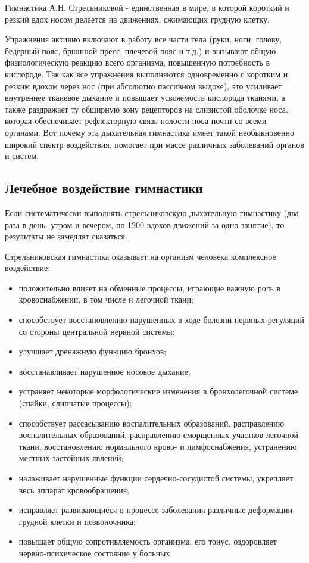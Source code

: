 \documentclass[14pt, a4paper]{article}
\begin{document}
    Гимнастика А.Н. Стрельниковой - единственная в мире, в которой короткий и резкий вдох носом делается на движениях, сжимающих грудную клетку.

    Упражнения активно включают в работу все части тела (руки, ноги, голову, бедерный пояс, брюшной пресс, плечевой пояс и т.д.) и вызывают общую физиологическую реакцию всего организма, повышенную потребность в кислороде. Так как все упражнения выполняются одновременно с коротким и резким вдохом через нос (при абсолютно пассивном выдохе), это усиливает внутреннее тканевое дыхание и повышает усвояемость кислорода тканями, а также раздражает ту обширную зону рецепторов на слизистой оболочке носа, которая обеспечивает рефлекторную связь полости носа почти со всеми органами. Вот почему эта дыхательная гимнастика имеет такой необыкновенно широкий спектр воздействия, помогает при массе различных заболеваний органов и систем.

    \subsection{Лечебное воздействие гимнастики}
    Если систематически выполнять стрельниковскую дыхательную гимнастику (два раза в день- утром и вечером, по 1200 вдохов-движений за одно занятие), то результаты не замедлят сказаться.

    Стрельниковская гимнастика оказывает на организм человека комплексное воздействие:
    \begin{itemize}
        \item положительно влияет на обменные процессы, играющие важную роль в кровоснабжении, в том числе и легочной ткани;
        \item способствует восстановлению нарушенных в ходе болезни нервных регуляций со стороны центральной нервной системы;
        \item улучшает дренажную функцию бронхов;
        \item восстанавливает нарушенное носовое дыхание;
        \item устраняет некоторые морфологические изменения в бронхолегочной системе (спайки, слипчатые процессы);
        \item способствует рассасыванию воспалительных образований, расправлению воспалительных образований, расправлению сморщенных участков легочной ткани, восстановлению нормального крово- и лимфоснабжения, устранению местных застойных явлений;
        \item налаживает нарушенные функции сердечно-сосудистой системы, укрепляет весь аппарат кровообращения;
        \item исправляет развивающиеся в процессе заболевания различные деформации грудной клетки и позвоночника;
        \item повышает общую сопротивляемость организма, его тонус, оздоровляет нервно-психическое состояние у больных.
    \end{itemize}
\end{document}
